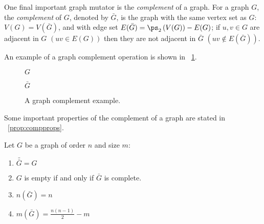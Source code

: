One final important graph mutator is the \emph{complement} of a graph.  For a graph \(G\), the \emph{complement} of
\(G\), denoted by \(\bar{G}\), is the graph with the same vertex set as \(G\): \(V(G)=V(\bar{G})\), and with edge
set \(E(\bar{G})=\ps_2\left(V(G)\right)-E(G)\); if \(u,v\in G\) are adjacent in \(G\) \(\left(uv\in E(G)\right)\)
then they are not adjacent in \(\bar{G}\) \(\left(uv\notin E(\bar{G})\right)\).

An example of a graph complement operation is shown in \figurename~\ref{fig:complement}.

\begin{figure}[H]
  \begin{minipage}{2.75in}
    \centering

    \(G\)
  \end{minipage}
  \begin{minipage}{2.75in}
    \centering

    \(\bar{G}\)
  \end{minipage}
  \caption{A graph complement example.}
  \label{fig:complement}
\end{figure}

Some important properties of the complement of a graph are stated in \propname~\ref{prop:compprops}.

\begin{proposition}
  \label{prop:compprops}
  Let \(G\) be a graph of order \(n\) and size \(m\):
  \begin{enumerate}
  \item \(\bar{\bar{G}}=G\)
  \item \(G\) is empty if and only if \(\bar{G}\) is complete.
  \item \(n(\bar{G})=n\)
  \item \(m(\bar{G})=\frac{n(n-1)}{2}-m\)
  \end{enumerate}
\end{proposition}

